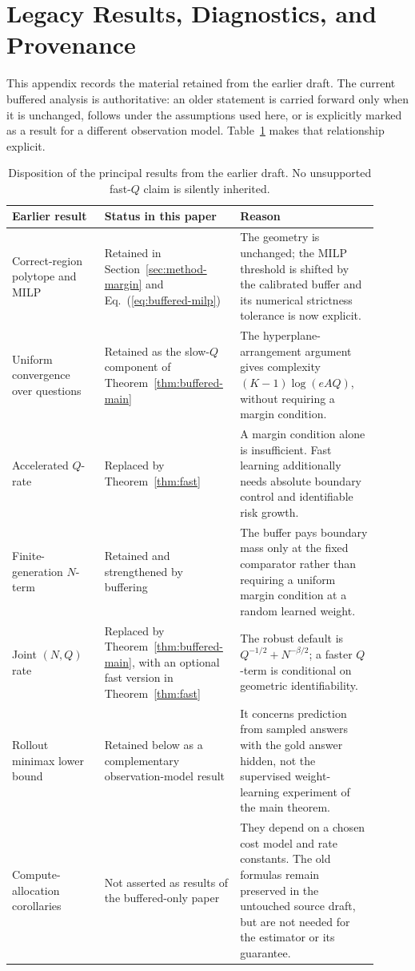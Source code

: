 \section{Legacy Results, Diagnostics, and Provenance}
\label{app:legacy}

This appendix records the material retained from the earlier draft.  The
current buffered analysis is authoritative: an older statement is carried
forward only when it is unchanged, follows under the assumptions used here, or
is explicitly marked as a result for a different observation model.
Table~\ref{tab:legacy-theory-map} makes that relationship explicit.

\begin{table}[t]
\centering
\small
\begin{tabular}{p{0.24\linewidth}p{0.31\linewidth}p{0.36\linewidth}}
\toprule
Earlier result & Status in this paper & Reason \\
\midrule
Correct-region polytope and MILP &
Retained in Section~\ref{sec:method-margin} and
Eq.~(\ref{eq:buffered-milp}) &
The geometry is unchanged; the MILP threshold is shifted by the calibrated
buffer and its numerical strictness tolerance is now explicit. \\
Uniform convergence over questions &
Retained as the slow-\(Q\) component of Theorem~\ref{thm:buffered-main} &
The hyperplane-arrangement argument gives complexity
\((K-1)\log(eAQ)\), without requiring a margin condition. \\
Accelerated \(Q\)-rate &
Replaced by Theorem~\ref{thm:fast} &
A margin condition alone is insufficient.  Fast learning additionally needs
absolute boundary control and identifiable risk growth. \\
Finite-generation \(N\)-term &
Retained and strengthened by buffering &
The buffer pays boundary mass only at the fixed comparator rather than
requiring a uniform margin condition at a random learned weight. \\
Joint \((N,Q)\) rate &
Replaced by Theorem~\ref{thm:buffered-main}, with an optional fast version in
Theorem~\ref{thm:fast} &
The robust default is \(Q^{-1/2}+N^{-\beta/2}\); a faster \(Q\)-term is
conditional on geometric identifiability. \\
Rollout minimax lower bound &
Retained below as a complementary observation-model result &
It concerns prediction from sampled answers with the gold answer hidden, not
the supervised weight-learning experiment of the main theorem. \\
Compute-allocation corollaries &
Not asserted as results of the buffered-only paper &
They depend on a chosen cost model and rate constants.  The old formulas
remain preserved in the untouched source draft, but are not needed for the
estimator or its guarantee. \\
\bottomrule
\end{tabular}
\caption{Disposition of the principal results from the earlier draft.  No
unsupported fast-\(Q\) claim is silently inherited.}
\label{tab:legacy-theory-map}
\end{table}

